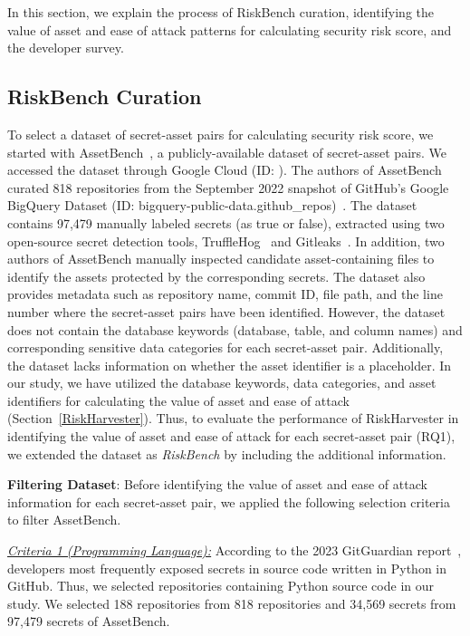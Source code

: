 In this section, we explain the process of RiskBench curation, identifying the value of asset and ease of attack patterns for calculating security risk score, and the developer survey.

\subsection{RiskBench Curation} \label{RiskBench}

To select a dataset of secret-asset pairs for calculating security risk score, we started with AssetBench~\cite{assetharvester}, a publicly-available dataset of secret-asset pairs. We accessed the dataset through Google Cloud (ID: ). The authors of AssetBench curated 818 repositories from the September 2022 snapshot of GitHub's Google BigQuery Dataset (ID: bigquery-public-data.github\_repos)~\cite{google-big-query}. The dataset contains 97,479 manually labeled secrets (as true or false), extracted using two open-source secret detection tools, TruffleHog~\cite{trufflehog} and Gitleaks~\cite{gitleaks}. In addition, two authors of AssetBench manually inspected candidate asset-containing files to identify the assets protected by the corresponding secrets. The dataset also provides metadata such as repository name, commit ID, file path, and the line number where the secret-asset pairs have been identified. However, the dataset does not contain the database keywords (database, table, and column names) and corresponding sensitive data categories for each secret-asset pair. Additionally, the dataset lacks information on whether the asset identifier is a placeholder. In our study, we have utilized the database keywords, data categories, and asset identifiers for calculating the value of asset and ease of attack (Section~\ref{RiskHarvester}). Thus, to evaluate the performance of RiskHarvester in identifying the value of asset and ease of attack for each secret-asset pair (RQ1), we extended the dataset as \textit{RiskBench} by including the additional information.

\textbf{Filtering Dataset}: Before identifying the value of asset and ease of attack information for each secret-asset pair, we applied the following selection criteria to filter AssetBench. 

\textit{\uline{Criteria 1 (Programming Language):}} According to the 2023 GitGuardian report~\cite{gitguardian-secret-sprawl-2023}, developers most frequently exposed secrets in source code written in Python in GitHub. Thus, we selected repositories containing Python source code in our study. We selected 188 repositories from 818 repositories and 34,569 secrets from 97,479 secrets of AssetBench.     


